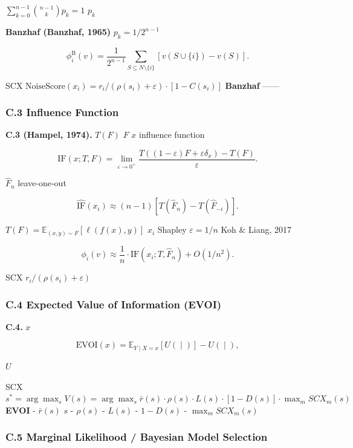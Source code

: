 \documentclass[
  12pt,
]{article}
\begin{document}
 \(\sum_{k=0}^{n-1} \binom{n-1}{k} p_k = 1\) \(p_k\) 

\textbf{Banzhaf  (Banzhaf, 1965)}  \(p_k = 1/2^{n-1}\) 

\[\phi_i^{\text{B}}(v) = \frac{1}{2^{n-1}} \sum_{S \subseteq N \setminus \{i\}} [v(S \cup \{i\}) - v(S)].\]

 SCX 
\(\text{NoiseScore}(x_i) = r_i / (\rho(s_i) + \varepsilon) \cdot [1 - C(s_i)]\)
\textbf{ Banzhaf
}------

\subsubsection{C.3  Influence Function
}\label{c.3-ux4e0e-influence-function-ux7684ux5173ux7cfb}

\textbf{ C.3 (Hampel, 1974).}  \(T(F)\) \(F\)
 \(x\)  influence function 

\[\text{IF}(x; T, F) = \lim_{\varepsilon \to 0^+} \frac{T((1-\varepsilon)F + \varepsilon\delta_x) - T(F)}{\varepsilon}.\]

 \(\hat{F}_n\) leave-one-out 

\[\hat{\text{IF}}(x_i) \approx (n-1)[T(\hat{F}_n) - T(\hat{F}_{-i})].\]


\(T(F) = \mathbb{E}_{(x,y) \sim F}[\ell(f(x), y)]\) \(x_i\)
 Shapley  \(\varepsilon = 1/n\) Koh \&
Liang, 2017

\[\phi_i(v) \approx \frac{1}{n} \cdot \text{IF}(x_i; T, \hat{F}_n) + O(1/n^2).\]

SCX  \(r_i / (\rho(s_i)+\varepsilon)\)
\textbf{}

\subsubsection{C.4  Expected Value of Information (EVOI)
}\label{c.4-ux4e0e-expected-value-of-information-evoi-ux7684ux5173ux7cfb}

\textbf{ C.4.}  \(x\) 

\[\text{EVOI}(x) = \mathbb{E}_{Y \mid X=x} [U(\text{} \mid \text{})] - U(\text{} \mid \text{}),\]

 \(U\) 

SCX 
\(s^* = \arg\max_s V(s) = \arg\max_s \bar{r}(s) \cdot \rho(s) \cdot L(s) \cdot [1-D(s)] \cdot \max_m SCX_m(s)\)
\textbf{ EVOI } - \(\bar{r}(s)\)  \(s\)
 - \(\rho(s)\)
 - \(L(s)\)  -
\(1-D(s)\)  - \(\max_m SCX_m(s)\)


\subsubsection{C.5  Marginal Likelihood / Bayesian Model Selection
}\label{c.5-ux4e0e-marginal-likelihood-bayesian-model-selection-ux7684ux5173ux7cfb}
\end{document}
